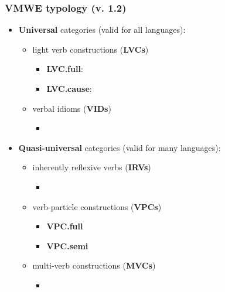 \documentclass[xcolor=dvipsnames]{beamer}
\begin{document}
\begin{frame}
  \vspace*{-5pt}
  \frametitle{VMWE typology (v. 1.2)}

\begin{scriptsize}
\begin{block}{}
\begin{itemize}
\item \textbf{Universal} categories (valid for all languages):
   \begin{itemize}
   \item light verb constructions (\textbf{LVCs})
	\begin{itemize}
	\item \textbf{LVC.full}:  
	\item \textbf{LVC.cause}:  
	\end{itemize}
   \item verbal idioms (\textbf{VIDs})
	\begin{itemize}
	\item[]  
	\end{itemize}
   \end{itemize}
\item \textbf{Quasi-universal} categories (valid for many languages):
   \begin{itemize}
   \item inherently reflexive verbs (\textbf{IRVs})
	\begin{itemize}
	\item[]  
	\end{itemize}
   \item verb-particle constructions (\textbf{VPCs})
	\begin{itemize}
	\item \textbf{VPC.full}  
	\item \textbf{VPC.semi}  
	\end{itemize}
   \item multi-verb constructions (\textbf{MVCs})
	\begin{itemize}
	\item[]  
	\end{itemize}
   \end{itemize}

\end{itemize}
\end{block}
\end{scriptsize}
\end{frame}
\end{document}
